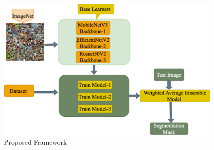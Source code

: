 \begin{figure}[H]
\centering
\includegraphics[width= 1\textwidth]{figs/first-3.png}
\caption{Proposed Framework}
\label{metho1}
\end{figure}




